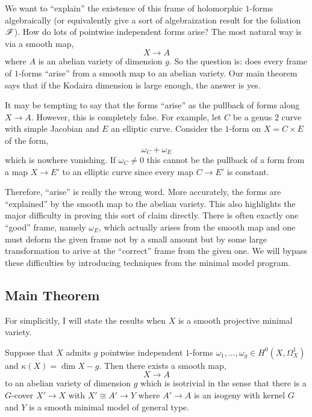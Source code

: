 \documentclass[12pt]{article}
\begin{document}
We want to ``explain'' the existence of this frame of holomorphic $1$-forms algebraically (or equivalently give a sort of algebraization result for the foliation $\mathscr{F}$). How do lots of pointwise independent forms arise? The most natural way is via a smooth map,
\[ X \to A \]
where $A$ is an abelian variety of dimension $g$. So the question is: does every frame of $1$-forms ``arise'' from a smooth map to an abelian variety. Our main theorem says that if the Kodaira dimension is large enough, the answer is yes. 

\begin{example}
It may be tempting to say that the forms ``arise'' as the pullback of forms along $X \to A$. However, this is completely false. For example, let $C$ be a genus $2$ curve with simple Jacobian and $E$ an elliptic curve. Consider the $1$-form on $X = C \times E$ of the form,
\[ \omega_C + \omega_E \]
which is nowhere vanishing. If $\omega_C \neq 0$ this cannot be the pullback of a form from a map $X \to E'$ to an elliptic curve since every map $C \to E'$ is constant. 
\end{example}

Therefore, ``arise'' is really the wrong word. More accurately, the forms are ``explained'' by the smooth map to the abelian variety. This also highlights the major difficulty in proving this sort of claim directly. There is often exactly one ``good'' frame, namely $\omega_E$, which actually arises from the smooth map and one must deform the given frame not by a small amount but by some large transformation to arive at the ``correct'' frame from the given one. We will bypass these difficulties by introducing techniques from the minimal model program.  

\subsection{Main Theorem}

For simplicitly, I will state the results when $X$ is a smooth projective minimal variety. 

\begin{theorem}[CCH, '23]
Suppose that $X$ admits $g$ pointwise independent $1$-forms $\omega_1, \dots, \omega_g \in H^0(X, \Omega_X^1)$ and $\kappa(X) = \dim{X} - g$. Then there exists a smooth map,
\[ X \to A \]
to an abelian variety of dimension $g$ which is isotrivial in the sense that there is a $G$-cover $X' \to X$ with $X' \cong A' \to Y$ where $A' \to A$ is an isogeny with kernel $G$ and $Y$ is a smooth minimal model of general type.
\end{theorem}
\end{document}
